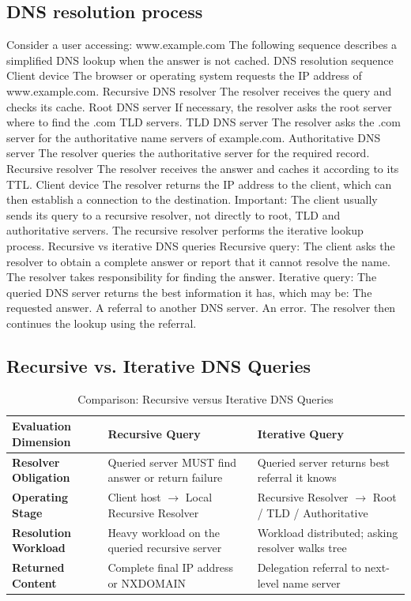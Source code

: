 \subsection{DNS resolution process}
Consider a user accessing:
www.example.com
The following sequence describes a simplified DNS lookup when the answer is not cached.
DNS resolution sequence
Client device
The browser or operating system requests the IP address of www.example.com.
Recursive DNS resolver
The resolver receives the query and checks its cache.
Root DNS server
If necessary, the resolver asks the root server where to find the .com TLD servers.
TLD DNS server
The resolver asks the .com server for the authoritative name servers of example.com.
Authoritative DNS server
The resolver queries the authoritative server for the required record.
Recursive resolver
The resolver receives the answer and caches it according to its TTL.
Client device
The resolver returns the IP address to the client, which can then establish a connection to the destination.
Important: The client usually sends its query to a recursive resolver, not directly to root, TLD and authoritative servers. The recursive resolver performs the iterative lookup process.
Recursive vs iterative DNS queries
Recursive query:
The client asks the resolver to obtain a complete answer or report that it cannot resolve the name.
The resolver takes responsibility for finding the answer.
Iterative query:
The queried DNS server returns the best information it has, which may be:
The requested answer.
A referral to another DNS server.
An error.
The resolver then continues the lookup using the referral.
\subsection{Recursive vs. Iterative DNS Queries}
\begin{table}[htbp]
\centering
\caption{Comparison: Recursive versus Iterative DNS Queries}
\label{tab:dns_recursive_vs_iterative}
\begin{tabularx}{\textwidth}{p{3.8cm} X X}
\toprule
\textbf{Evaluation Dimension} & \textbf{Recursive Query} & \textbf{Iterative Query} \\
\midrule
\textbf{Resolver Obligation} & Queried server MUST find answer or return failure & Queried server returns best referral it knows \\
\textbf{Operating Stage} & Client host $\to$ Local Recursive Resolver & Recursive Resolver $\to$ Root / TLD / Authoritative \\
\textbf{Resolution Workload} & Heavy workload on the queried recursive server & Workload distributed; asking resolver walks tree \\
\textbf{Returned Content} & Complete final IP address or NXDOMAIN & Delegation referral to next-level name server \\
\bottomrule
\end{tabularx}
\end{table}
